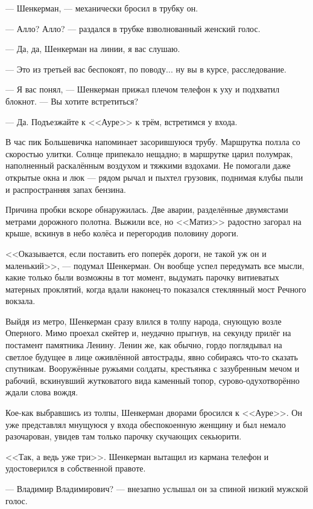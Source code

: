 \documentclass[a4paper,10pt,fleqn]{book}\usepackage{polyglossia}\setdefaultlanguage{english}\setotherlanguage{russian}\defaultfontfeatures{Ligatures=TeX,Mapping=tex-text} \usepackage{xcolor}\definecolor{lightgray}{HTML}{bbbbbb}\color{lightgray}\newcommand{\ml}[3]{\textcolor{black}{#3}}
\newcommand{\asterism}{\vspace{1em}{\centering\Large\bfseries$\ast~\ast~\ast$\par}\vspace{1em}}
\begin{document}
--- Шенкерман, --- механически бросил в трубку он.

--- Алло? Алло? --- раздался в трубке взволнованный женский голос.

--- Да, да, Шенкерман на линии, я вас слушаю.

--- Это из третьей вас беспокоят, по поводу... ну вы в курсе, расследование.

--- Я вас понял, --- Шенкерман прижал плечом телефон к уху и подхватил блокнот.
--- Вы хотите встретиться?

--- Да.
Подъезжайте к <<Ауре>> к трём, встретимся у входа.

\asterism

В час пик Большевичка напоминает засорившуюся трубу.
Маршрутка ползла со скоростью улитки.
Солнце припекало нещадно;
в маршрутке царил полумрак, наполненный раскалённым воздухом и тяжкими вздохами.
Не помогали даже открытые окна и люк --- рядом рычал и пыхтел грузовик, поднимая клубы пыли и распространняя запах бензина.

Причина пробки вскоре обнаружилась.
Две аварии, разделённые двумястами метрами дорожного полотна.
Выжили все, но <<Матиз>> радостно загорал на крыше, вскинув в небо колёса и перегородив половину дороги.

<<Оказывается, если поставить его поперёк дороги, не такой уж он и маленький>>, --- подумал Шенкерман.
Он вообще успел передумать все мысли, какие только были возможны в тот момент, выдумать парочку витиеватых матерных проклятий, когда вдали наконец-то показался стеклянный мост Речного вокзала.

Выйдя из метро, Шенкерман сразу влился в толпу народа, снующую возле Оперного.
Мимо проехал скейтер и, неудачно прыгнув, на секунду прилёг на постамент памятника Ленину.
Ленин же, как обычно, гордо поглядывал на светлое будущее в лице оживлённой автострады, явно собираясь что-то сказать спутникам.
Вооружённые ружьями солдаты, крестьянка с зазубренным мечом и рабочий, вскинувший жутковатого вида каменный топор, сурово-одухотворённо ждали слова вождя.

Кое-как выбравшись из толпы, Шенкерман дворами бросился к <<Ауре>>.
Он уже представлял мнущуюся у входа обеспокоенную женщину и был немало разочарован, увидев там только парочку скучающих секьюрити.

<<Так, а ведь уже три>>.
Шенкерман вытащил из кармана телефон и удостоверился в собственной правоте.

--- Владимир Владимирович? --- внезапно услышал он за спиной низкий мужской голос.
\end{document}

